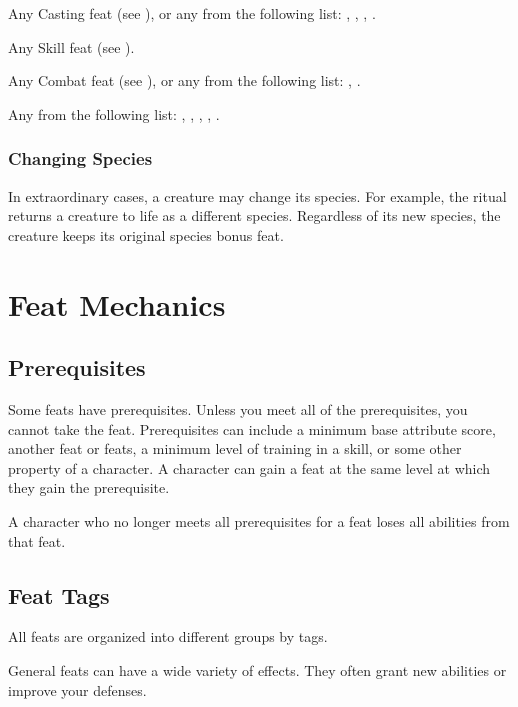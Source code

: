          Any Casting feat (see ), or any from the following list: , , , .

         Any Skill feat (see ).

         Any Combat feat (see ), or any from the following list: , .

         Any from the following list: , , , , .

        \subsubsection{Changing Species}
            In extraordinary cases, a creature may change its species.
            For example, the  ritual returns a creature to life as a different species.
            Regardless of its new species, the creature keeps its original species bonus feat.

\section{Feat Mechanics}

    \subsection{Prerequisites}
        Some feats have prerequisites.
        Unless you meet all of the prerequisites, you cannot take the feat.
        Prerequisites can include a minimum base attribute score, another feat or feats, a minimum level of training in a skill, or some other property of a character.
        A character can gain a feat at the same level at which they gain the prerequisite.

        A character who no longer meets all prerequisites for a feat loses all abilities from that feat.

    \subsection{Feat Tags}
        All feats are organized into different groups by tags.

         General feats can have a wide variety of effects.
        They often grant new abilities or improve your defenses.

